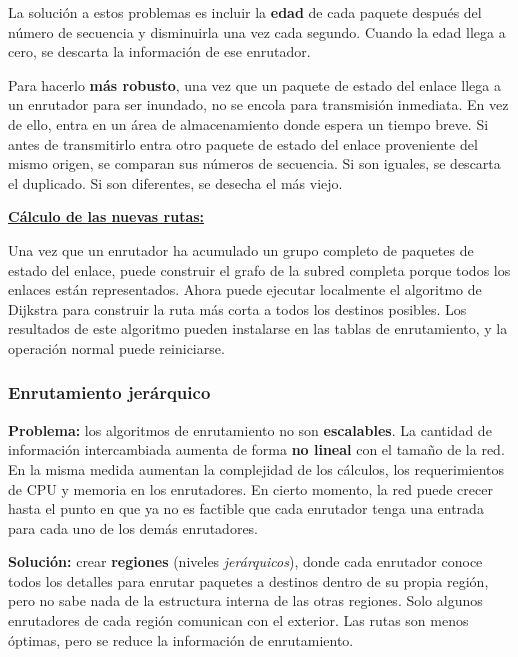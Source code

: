\documentclass[10pt,a4paper]{article}
\begin{document}
La solución a estos problemas es incluir la \textbf{edad} de cada paquete después del número de secuencia y disminuirla una vez cada segundo. Cuando la edad llega a cero, se descarta la información de ese enrutador.

Para hacerlo \textbf{más robusto}, una vez que un paquete de estado del enlace llega a un enrutador para ser inundado, no se encola para transmisión inmediata. En vez de ello, entra en un área de almacenamiento donde espera un tiempo breve. Si antes de transmitirlo entra otro paquete de estado del enlace proveniente del mismo origen, se comparan sus números de secuencia. Si son iguales, se descarta el duplicado. Si son diferentes, se desecha
el más viejo.

\underline{\textbf{Cálculo de las nuevas rutas:}}

Una vez que un enrutador ha acumulado un grupo completo de paquetes de estado del enlace, puede construir el grafo de la subred completa porque todos los enlaces están representados. Ahora puede ejecutar localmente el algoritmo de Dijkstra para construir la ruta más corta a todos los destinos posibles. Los resultados de este algoritmo pueden instalarse en las tablas de enrutamiento, y la operación normal puede reiniciarse.

\subsubsection{Enrutamiento jerárquico}

\begin{description}
\item \textbf{Problema:} los algoritmos de enrutamiento no son \textbf{escalables}. La cantidad de información intercambiada aumenta de forma \textbf{no lineal} con el tamaño de la red. En la misma medida aumentan la complejidad de los cálculos, los requerimientos de CPU y memoria en los enrutadores. En cierto momento, la red puede crecer hasta el punto en que ya no es factible que cada enrutador tenga una entrada para cada uno de los
demás enrutadores.
\item \textbf{Solución:} crear \textbf{regiones} (niveles \textit{jerárquicos}), donde cada enrutador conoce todos los detalles para enrutar paquetes a destinos dentro de su propia región, pero no sabe nada de la estructura interna de las otras regiones. Solo algunos enrutadores de cada región comunican con el exterior. Las rutas son menos óptimas, pero se reduce la información de enrutamiento.
\end{description}
\end{document}
